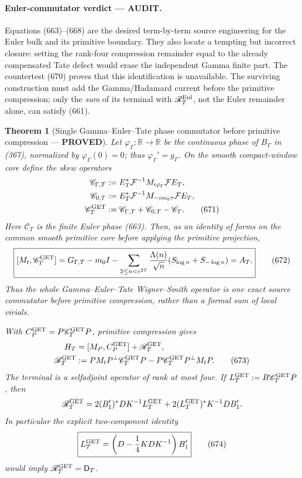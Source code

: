 \documentclass[11pt]{article}
\newtheorem{theorem}{Theorem}
\newcommand{\PROVED}{\textcolor{green!45!black}{\textbf{PROVED}}}
\newcommand{\AUDIT}{\textcolor{orange!75!black}{\textbf{AUDIT}}}
\begin{document}
\paragraph{Euler-commutator verdict --- \AUDIT.}
Equations (663)--(668) are the desired term-by-term source engineering for
the Euler bulk and its primitive boundary.  They also locate a tempting but
incorrect closure: setting the rank-four compression remainder equal to the
already compensated Tate defect would erase the independent Gamma finite
part.  The countertest (670) proves that this identification is unavailable.
The surviving construction must add the Gamma/Hadamard current before the
primitive compression; only the \emph{sum} of its terminal with
\(\mathscr R_T^{\rm Eul}\), not the Euler remainder alone, can satisfy
(661).

\begin{theorem}[Single Gamma--Euler--Tate phase commutator before primitive
compression --- \PROVED]
Let \(\varphi_\Gamma:\mathbb R\to\mathbb R\) be the continuous phase of
\(B_\Gamma\) in (367), normalized by \(\varphi_\Gamma(0)=0\); thus
\(\varphi_\Gamma'=g_\Gamma\).  On the smooth compact-window core define
the skew operators
\begin{align}
 \mathscr C_{\Gamma,T}
 &:=E_T^*\mathcal F^{-1}M_{i\varphi_\Gamma}\mathcal FE_T,\notag\\
 \mathscr C_{0,T}
 &:=E_T^*\mathcal F^{-1}M_{-im_0\tau}\mathcal FE_T,\notag\\
 \mathscr C_T^{\rm GET}
 &:=\mathscr C_{\Gamma,T}+\mathscr C_{0,T}-\mathscr C_T. \tag{671}
\end{align}
Here \(\mathscr C_T\) is the finite Euler phase (663).  Then, as an
identity of forms on the common smooth primitive core before applying the
primitive projection,
\begin{equation}
 \boxed{[M_t,\mathscr C_T^{\rm GET}]
 =G_{\Gamma,T}-m_0I-
   \sum_{2\le n<e^{2T}}\frac{\Lambda(n)}{\sqrt n}
      (S_{\log n}+S_{-\log n})=A_T.}                \tag{672}
\end{equation}
Thus the whole Gamma--Euler--Tate Wigner--Smith operator is one exact source
commutator before primitive compression, rather than a formal sum of local
virials.

With \(C_P^{\rm GET}=P\mathscr C_T^{\rm GET}P\), primitive compression
gives
\begin{align}
 H_T&=[M_P,C_P^{\rm GET}]+\mathscr R_T^{\rm GET},\notag\\
 \mathscr R_T^{\rm GET}
 &:=PM_tP^\perp\mathscr C_T^{\rm GET}P
   -P\mathscr C_T^{\rm GET}P^\perp M_tP.            \tag{673}
\end{align}
The terminal is a selfadjoint operator of rank at most four.  If
\(L_T^{\rm GET}:=B\mathscr C_T^{\rm GET}P\), then
\[
 \mathscr R_T^{\rm GET}
 =2(B_1')^*DK^{-1}L_T^{\rm GET}
  +2(L_T^{\rm GET})^*K^{-1}DB_1'.
\]
In particular the explicit two-component identity
\begin{equation}
 \boxed{
 L_T^{\rm GET}
 =\left(D-\frac14KDK^{-1}\right)B_1'}              \tag{674}
\end{equation}
would imply \(\mathscr R_T^{\rm GET}=\mathsf D_T\).
\end{theorem}
\end{document}

